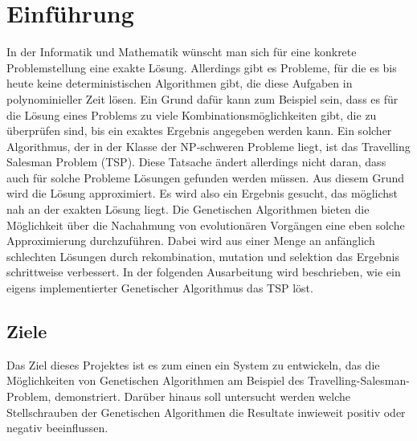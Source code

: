 
\section{Einführung}
In der Informatik und Mathematik wünscht man sich für eine konkrete Problemstellung eine exakte Lösung. Allerdings gibt es Probleme, für die es bis heute keine deterministischen Algorithmen gibt, die diese Aufgaben in polynominieller Zeit lösen. 
Ein Grund dafür kann zum Beispiel sein, dass es für die Lösung eines Problems zu viele Kombinationsmöglichkeiten gibt, die zu überprüfen sind, bis ein exaktes Ergebnis angegeben werden kann. Ein solcher Algorithmus, der in der Klasse der NP-schweren Probleme liegt, ist das Travelling Salesman Problem (TSP).
Diese Tatsache ändert allerdings nicht daran, dass auch für solche Probleme Lösungen gefunden werden müssen. Aus diesem Grund wird die Lösung approximiert. Es wird also ein Ergebnis gesucht, das möglichst nah an der exakten Lösung liegt. 
Die Genetischen Algorithmen bieten die Möglichkeit über die Nachahmung von evolutionären Vorgängen eine eben solche Approximierung durchzuführen.
Dabei wird aus einer Menge an anfänglich schlechten Lösungen durch rekombination, mutation und selektion das Ergebnis schrittweise verbessert. In der folgenden Ausarbeitung wird beschrieben, wie ein eigens implementierter Genetischer Algorithmus das TSP löst.

\subsection{Ziele}
Das Ziel dieses Projektes ist es zum einen ein System zu entwickeln, das die Möglichkeiten von Genetischen Algorithmen am Beispiel des Travelling-Salesman-Problem, demonstriert.
Darüber hinaus soll untersucht werden welche Stellschrauben der Genetischen Algorithmen die Resultate inwieweit positiv oder negativ beeinflussen.

